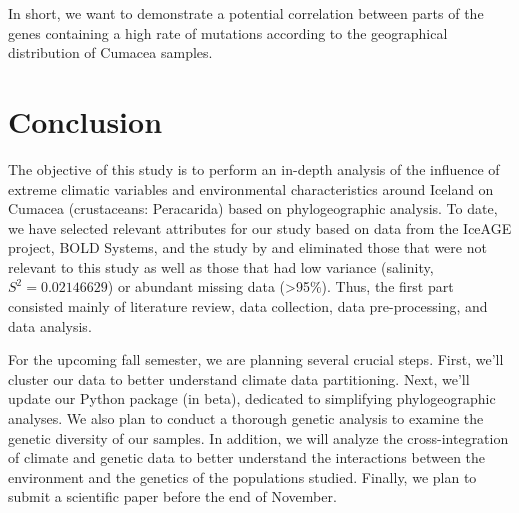 In short, we want to demonstrate a potential correlation between parts of the genes containing a high rate of mutations according to the geographical distribution of Cumacea samples.

\section{Conclusion}\label{conclusion}

The objective of this study is to perform an in-depth analysis of the influence of extreme climatic variables and environmental characteristics around Iceland on Cumacea (crustaceans: Peracarida) based on phylogeographic analysis. To date, we have selected relevant attributes for our study based on data from the IceAGE project, BOLD Systems, and the study by \cite{uhlir_adding_2021} and eliminated those that were not relevant to this study as well as those that had low variance (salinity, \( S^2 = 0.02146629 \)) or abundant missing data (>95\%). Thus, the first part consisted mainly of literature review, data collection, data pre-processing, and data analysis.

For the upcoming fall semester, we are planning several crucial steps. First, we'll cluster our data to better understand climate data partitioning. Next, we'll update our Python package (in beta), dedicated to simplifying phylogeographic analyses. We also plan to conduct a thorough genetic analysis to examine the genetic diversity of our samples. In addition, we will analyze the cross-integration of climate and genetic data to better understand the interactions between the environment and the genetics of the populations studied. Finally, we plan to submit a scientific paper before the end of November.